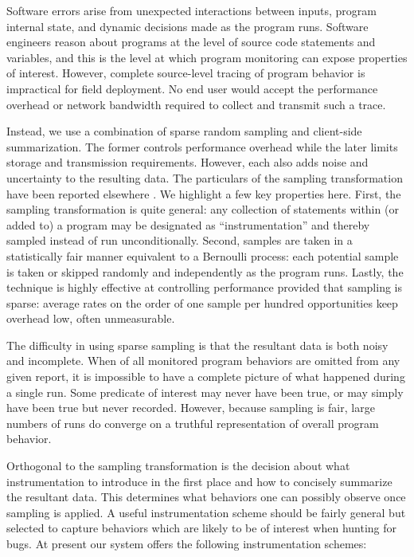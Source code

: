 \documentclass{sig-alternate}
\begin{document}
Software errors arise from unexpected interactions between inputs,
program internal state, and dynamic decisions made as the program
runs.  Software engineers reason about programs at the level of source
code statements and variables, and this is the level at which program
monitoring can expose properties of interest.  However, complete
source-level tracing of program behavior is impractical for field
deployment.  No end user would accept the performance overhead or
network bandwidth required to collect and transmit such a trace.

Instead, we use a combination of sparse random sampling and
client-side summarization.  The former controls performance overhead
while the later limits storage and transmission requirements.
However, each also adds noise and uncertainty to the resulting data.
The particulars of the sampling transformation have been reported
elsewhere \cite{PLDI`03*141}.  We highlight a few key properties here.
First, the sampling transformation is quite general: any collection of
statements within (or added to) a program may be designated as
``instrumentation'' and thereby sampled instead of run
unconditionally.  Second, samples are taken in a statistically fair
manner equivalent to a Bernoulli process: each potential sample is
taken or skipped randomly and independently as the program runs.
Lastly, the technique is highly effective at controlling performance
provided that sampling is sparse: average rates on the order of one
sample per hundred opportunities keep overhead low, often
unmeasurable.

The difficulty in using sparse sampling is that the resultant data is
both noisy and incomplete.  When  of all monitored
program behaviors are omitted from any given report, it is impossible
to have a complete picture of what happened during a single run.  Some
predicate of interest may never have been true, or may simply have
been true but never recorded.  However, because sampling is fair,
large numbers of runs do converge on a truthful representation of
overall program behavior.

Orthogonal to the sampling transformation is the decision about what
instrumentation to introduce in the first place and how to concisely
summarize the resultant data.  This determines what behaviors one can
possibly observe once sampling is applied.  A useful instrumentation
scheme should be fairly general but selected to capture behaviors
which are likely to be of interest when hunting for bugs.  At present
our system offers the following instrumentation schemes:
\end{document}

